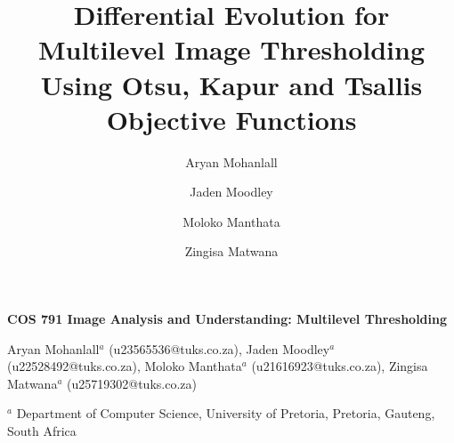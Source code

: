 \documentclass[review,authoryear]{elsarticle}
\begin{document}
\begin{frontmatter}




\begin{titlepage}
\begin{center}

\vspace*{1cm}

\textbf{\large COS 791 Image Analysis and Understanding: Multilevel Thresholding}

\vspace{1.5cm}

Aryan Mohanlall$^{a}$ (u23565536@tuks.co.za),
Jaden Moodley$^{a}$ (u22528492@tuks.co.za),
Moloko Manthata$^{a}$ (u21616923@tuks.co.za),
Zingisa Matwana$^{a}$ (u25719302@tuks.co.za) \\

\vspace{0.5cm}

\begin{flushleft}
\small
$^a$ Department of Computer Science, University of Pretoria,
Pretoria, Gauteng, South Africa

\vspace{1cm}

\end{flushleft}

\end{center}
\end{titlepage}





\title{Differential Evolution for Multilevel Image Thresholding Using Otsu, Kapur and Tsallis Objective Functions}

\author[label1]{Aryan Mohanlall }

\author[label1]{Jaden Moodley}

\author[label1]{Moloko Manthata}

\author[label1]{Zingisa Matwana}


\address[label1]
{Department of Computer Science, University of Pretoria,
Pretoria, Gauteng, South Africa}





\begin{abstract}


\end{abstract}
\end{frontmatter}
\end{document}
